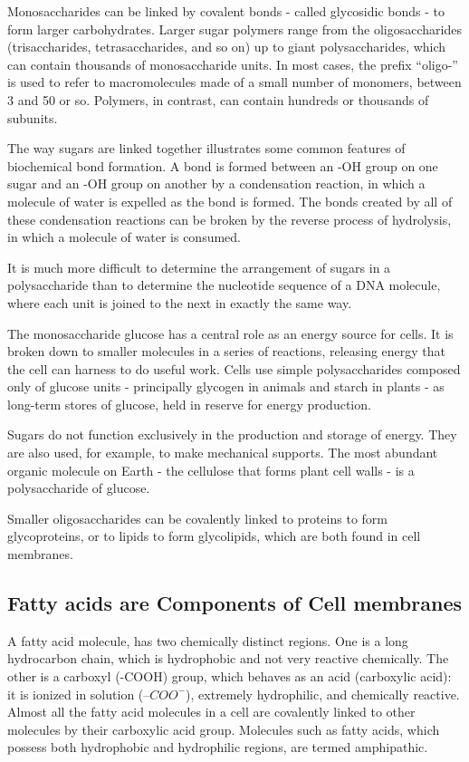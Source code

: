Monosaccharides can be linked by covalent bonds - called glycosidic
bonds - to form larger carbohydrates.
Larger sugar polymers range from the oligosaccharides (trisaccharides, tetrasaccharides, and so on) up to giant
polysaccharides, which can contain thousands of monosaccharide units.
In most cases, the prefix “oligo-” is used to refer to macromolecules made
of a small number of monomers, between 3 and 50 or so. Polymers, in
contrast, can contain hundreds or thousands of subunits.

The way sugars are linked together illustrates some common features of
biochemical bond formation. A bond is formed between an -OH group
on one sugar and an -OH group on another by a condensation reaction,
in which a molecule of water is expelled as the bond is formed.
The bonds created by all of these condensation reactions can
be broken by the reverse process of hydrolysis, in which a molecule of
water is consumed.

It is much more
difficult to determine the arrangement of sugars in a polysaccharide than
to determine the nucleotide sequence of a DNA molecule, where each
unit is joined to the next in exactly the same way.

The monosaccharide glucose has a central role as an energy source for
cells. It is broken down to smaller molecules in a series of reactions,
releasing energy that the cell can harness to do useful work.
Cells use simple polysaccharides composed only
of glucose units - principally glycogen in animals and starch in plants - as
long-term stores of glucose, held in reserve for energy production.

Sugars do not function exclusively in the production and storage of
energy. They are also used, for example, to make mechanical supports.
The most abundant organic molecule on Earth - the cellulose that forms
plant cell walls - is a polysaccharide of glucose.

Smaller oligosaccharides can be covalently linked to proteins to form
glycoproteins, or to lipids to form glycolipids,
which are both found in cell membranes.

\subsection{Fatty acids are Components of Cell membranes}

A fatty acid molecule, has two
chemically distinct regions. One is a long hydrocarbon chain, which is
hydrophobic and not very reactive chemically. The other is a carboxyl
(-COOH) group, which behaves as an acid (carboxylic acid): it is ionized
in solution ($–COO^{-}$), extremely hydrophilic, and chemically reactive.
Almost all the fatty acid molecules in a cell are covalently linked to other
molecules by their carboxylic acid group.
Molecules such as fatty acids, which possess both hydrophobic and
hydrophilic regions, are termed amphipathic.

